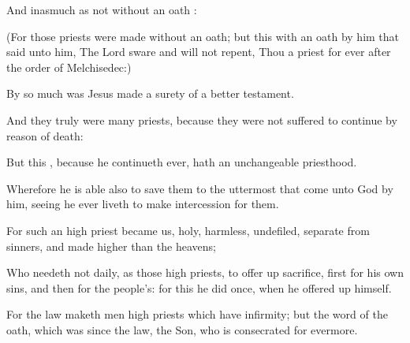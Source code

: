 {And
inasmuch
as
not
without an
oath
{}:

(For those
priests
were
made
without an
oath;
but
this
with an
oath
by him that
said
unto
him, The
Lord
sware
and
will
not
repent,
Thou
{} a
priest
for
ever
after the
order of
Melchisedec:)

By so
much
was
Jesus
made a
surety of
a
better
testament.

And
they
truly
were
many
priests,
because they were not
suffered to
continue by reason of
death:

But
this
{},
because
he
continueth
ever,
hath
an
unchangeable
priesthood.

Wherefore he is
able
also to
save
them
to the
uttermost that
come unto
God
by
him, seeing
he
ever
liveth
to make
intercession
for
them.

For
such an high
priest
became
us,
{}
holy,
harmless,
undefiled,
separate
from
sinners,
and
made
higher than the
heavens;

Who
needeth
not
daily,
as those high
priests, to offer
up
sacrifice,
first
for his
own
sins, and
then for the
people’s:
for
this he
did
once, when he offered
up
himself.

For the
law
maketh
men high
priests which
have
infirmity;
but the
word of the
oath, which
was
since the
law,
{} the
Son, who is
consecrated
for
evermore.




\par }
